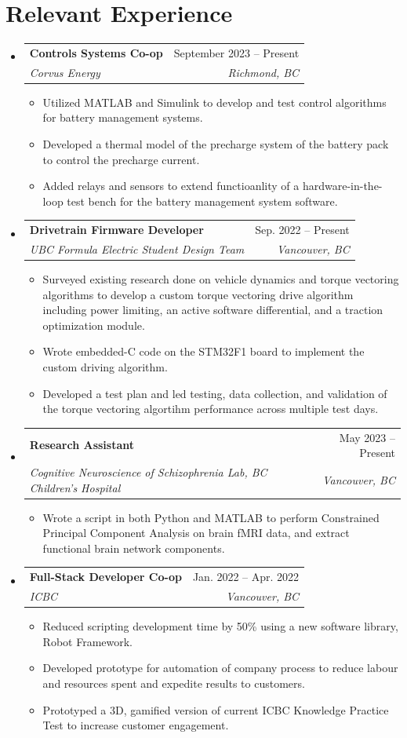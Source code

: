 \documentclass[letterpaper,11pt]{article}
\makeatletter
\newcommand{\resumeItem}[1]{
  \item\small{
    {#1 \vspace{-2pt}}
  }
}
\newcommand{\resumeSubheading}[4]{
  \vspace{-2pt}\item
    \begin{tabular*}{0.97\textwidth}[t]{l@{\extracolsep{\fill}}r}
      \textbf{#1} & #2 \\
      \textit{\small#3} & \textit{\small #4} \\
    \end{tabular*}\vspace{-7pt}
}
\newcommand{\resumeSubHeadingListStart}{\begin{itemize}[leftmargin=0.15in, label={}]}
\newcommand{\resumeSubHeadingListEnd}{\end{itemize}}
\newcommand{\resumeItemListStart}{\begin{itemize}}
\newcommand{\resumeItemListEnd}{\end{itemize}\vspace{-5pt}}
\makeatother
\begin{document}
\section{Relevant Experience}
  \resumeSubHeadingListStart
    \resumeSubheading
      {Controls Systems Co-op}{September 2023 -- Present}
      {Corvus Energy}{Richmond, BC}
      \resumeItemListStart
        \resumeItem{Utilized MATLAB and Simulink to develop and test control algorithms for battery management systems.}
        \resumeItem{Developed a thermal model of the precharge system of the battery pack to control the precharge current.}
        \resumeItem{Added relays and sensors to extend functioanlity of a hardware-in-the-loop test bench for the battery management system software.}
      \resumeItemListEnd
  \resumeSubheading
      {Drivetrain Firmware Developer}{Sep. 2022 -- Present}
      {UBC Formula Electric Student Design Team}{Vancouver, BC}
      \resumeItemListStart
        \resumeItem{Surveyed existing research done on vehicle dynamics and torque vectoring algorithms to develop a custom torque vectoring drive algorithm including power limiting, an active software differential, and a traction optimization module.}
        \resumeItem{Wrote embedded-C code on the STM32F1 board to implement the custom driving algorithm.}
        \resumeItem{Developed a test plan and led testing, data collection, and validation of the torque vectoring algortihm performance across multiple test days.}
      \resumeItemListEnd
    \resumeSubheading
      {Research Assistant}{May 2023 -- Present}
      {Cognitive Neuroscience of Schizophrenia Lab, BC Children's Hospital}{Vancouver, BC}
      \resumeItemListStart
        \resumeItem{Wrote a script in both Python and MATLAB to perform Constrained Principal Component Analysis on brain fMRI data, and extract functional brain network components.}
      \resumeItemListEnd
  \resumeSubheading
      {Full-Stack Developer Co-op}{Jan. 2022 -- Apr. 2022}
      {ICBC}{Vancouver, BC}
      \resumeItemListStart
        \resumeItem{Reduced scripting development time by 50\% using a new software library, Robot Framework.}
        \resumeItem{Developed prototype for automation of company process to reduce labour and resources spent and expedite results to customers.}
        \resumeItem{Prototyped a 3D, gamified version of current ICBC Knowledge Practice Test to increase customer engagement.}
      \resumeItemListEnd
  \resumeSubHeadingListEnd


\end{document}

